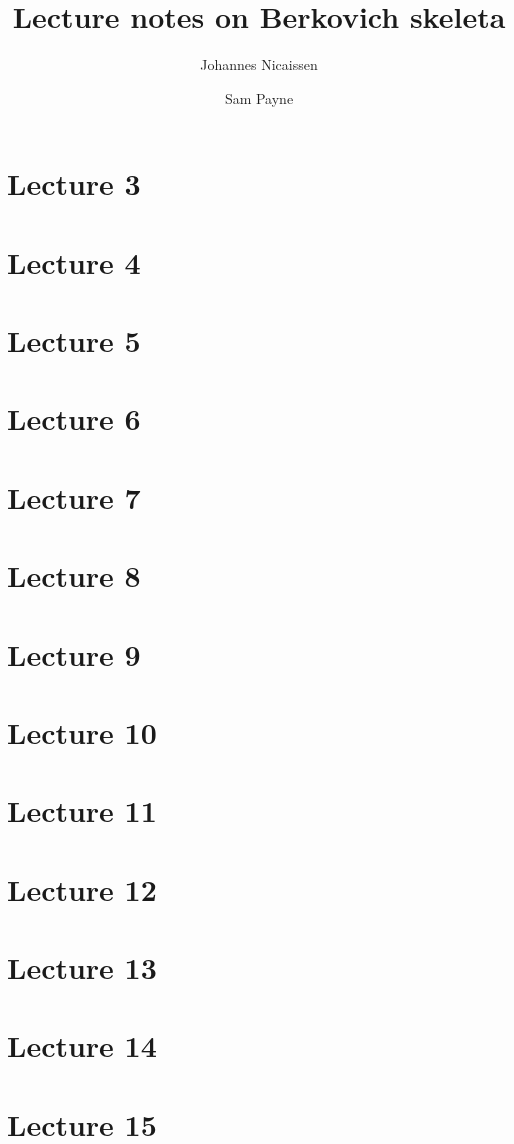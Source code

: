 \documentclass[10pt,a4paper]{article}
\title{Lecture notes on Berkovich skeleta}
\author{Johannes Nicaissen \and Sam Payne}
\begin{document}
\maketitle




\section{Lecture 3}
\section{Lecture 4}
\section{Lecture 5}
\section{Lecture 6}
\section{Lecture 7}
\section{Lecture 8}
\section{Lecture 9}
\section{Lecture 10}
\section{Lecture 11}
\section{Lecture 12}
\section{Lecture 13}
\section{Lecture 14}
\section{Lecture 15}
\end{document}
